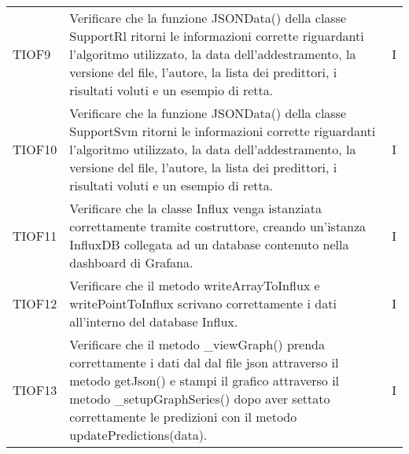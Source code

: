 \begin{longtable}{C{2cm} L{8cm} C{2cm}}
TIOF9 & Verificare che la funzione JSONData() della classe SupportRl ritorni le informazioni corrette riguardanti l'algoritmo utilizzato, la data dell'addestramento, la versione del file, l'autore, la lista dei predittori, i risultati voluti e un esempio di retta. & I \\
TIOF10 & Verificare che la funzione JSONData() della classe SupportSvm ritorni le informazioni corrette riguardanti l'algoritmo utilizzato, la data dell'addestramento, la versione del file, l'autore, la lista dei predittori, i risultati voluti e un esempio di retta. & I \\
TIOF11 & Verificare che la classe Influx venga istanziata correttamente tramite costruttore, creando un’istanza InfluxDB collegata ad un database contenuto nella dashboard di Grafana. & I \\
TIOF12 & Verificare che il metodo writeArrayToInflux e writePointToInflux scrivano correttamente i dati all'interno del database Influx. & I \\
TIOF13 & Verificare che il metodo \_viewGraph() prenda correttamente i dati dal dal file json attraverso il metodo getJson() e stampi il grafico attraverso il metodo \_setupGraphSeries() dopo aver settato correttamente le predizioni con il metodo updatePredictions(data). & I \\
\end{longtable}
\pagebreak
